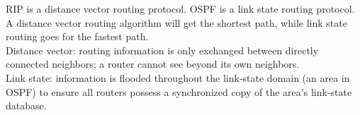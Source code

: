 RIP is a distance vector routing protocol. OSPF is a link state routing protocol. \\
A distance vector routing algorithm will get the shortest path, while link state routing goes for the fastest path. \\

Distance vector: routing information is only exchanged between directly connected neighbors; a router cannot see beyond its own neighbors. \\
Link state: information is flooded throughout the link-state domain (an area in OSPF) to ensure all routers possess a synchronized copy of the area's link-state database.
